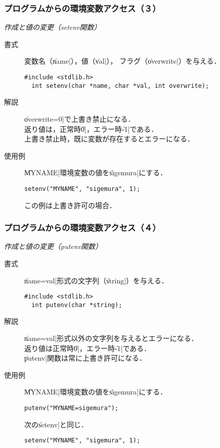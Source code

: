 \documentclass{beamer}                 %
\begin{document}
\begin{frame}[fragile]
  \frametitle{プログラムからの環境変数アクセス（３）}
  \emph{作成と値の変更（setenv関数）}
  \begin{description}
  \item [書式] 変数名（\|name|），値（\|val|），
    フラグ（\|overwrite|）を与える．
\begin{lstlisting}[numbers=none]
  #include <stdlib.h>
  int setenv(char *name, char *val, int overwrite);
\end{lstlisting}
  \item [解説] \|overwrite=0|で上書き禁止になる．\\
    返り値は，正常時\|0|，エラー時\|-1|である．\\
    上書き禁止時，既に変数が存在するとエラーになる．
  \item [使用例] \|MYNAME|環境変数の値を\|sigemura|にする．
\begin{lstlisting}[numbers=none]
  setenv("MYNAME", "sigemura", 1);
\end{lstlisting}
    この例は上書き許可の場合．
  \end{description}
  \vfill
\end{frame}

\begin{frame}[fragile]
  \frametitle{プログラムからの環境変数アクセス（４）}
  \emph{作成と値の変更（putenv関数）}
  \begin{description}
  \item [書式] \|name=val|形式の文字列（\|string|）を与える．
\begin{lstlisting}[numbers=none]
  #include <stdlib.h>
  int putenv(char *string);
\end{lstlisting}
  \item [解説] \|name=val|形式以外の文字列を与えるとエラーになる．\\
    返り値は正常時\|0|，エラー時\|-1|である．\\
    \|putenv|関数は常に上書き許可になる．
  \item [使用例] \|MYNAME|環境変数の値を\|sigemura|にする．
\begin{lstlisting}[numbers=none]
  putenv("MYNAME=sigemura");
\end{lstlisting}
    次の\|setenv|と同じ．
\begin{lstlisting}[numbers=none]
  setenv("MYNAME", "sigemura", 1);
\end{lstlisting}
  \end{description}
  \vfill
\end{frame}
\end{document}
